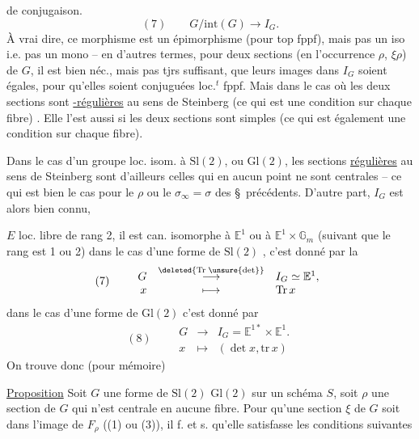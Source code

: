 de conjugaison.
\[
(7)\qquad G/\mathrm{int}(G)\longrightarrow I_G.
\]
À vrai dire,  ce morphisme est un épimorphisme (pour  top fppf), mais pas un iso i.e. pas un mono -- en d'autres termes, pour deux sections (en l'occurrence $\rho$, $\xi\rho$) de $G$, il est bien néc., mais pas tjrs suffisant, que leurs images dans $I_G$ soient égales, pour qu'elles soient conjuguées loc.$^{t}$ fppf. Mais dans le cas où les deux sections sont \uline{-régulières} au sens de Steinberg (ce qui est une condition sur chaque fibre)  . Elle l'est aussi si les deux sections sont  simples (ce qui est également une condition sur chaque fibre).

Dans le cas d'un groupe loc. isom. à $\mathrm{Sl}(2)$,  ou $\mathrm{Gl}(2)$, les sections \uline{régulières} au sens de Steinberg sont d'ailleurs celles qui en aucun point ne sont centrales -- ce qui est bien le cas pour le $\rho$ ou le $\sigma_\infty=\sigma$ des \S\ précédents. D'autre part, $I_G$ est alors bien connu, 

$E$ loc. libre de rang 2, il est can. isomorphe à $\mathbb E^1$ ou à $\mathbb E^1\times\mathbb G_m$ (suivant que le rang est 1 ou 2) dans le cas d'une forme de $\mathrm{Sl}(2)$ , c'est donné par la \uline{}
\[
(7)\qquad
\begin{array}{rcl}
G&\overset{\deleted{\mathrm{Tr}\;\unsure{\det}}}{\longrightarrow}&I_G\simeq\mathbb E^1,\\
x&\longmapsto&\mathrm{Tr}\,x
\end{array}
\]
dans le cas d'une forme de $\mathrm{Gl}(2)$ c'est donné par
\[
(8)\qquad
\begin{array}{rcl}
G&\longrightarrow&I_G=\mathbb E^{1*}\times\mathbb E^1.\\
x&\longmapsto&(\det x,\mathrm{tr}\,x)
\end{array}
\]
On trouve donc (pour mémoire)

\uline{Proposition} Soit $G$ une forme de $\mathrm{Sl}(2)$  $\mathrm{Gl}(2)$ sur un schéma $S$, soit $\rho$ une section de $G$ qui n'est centrale en aucune fibre. Pour qu'une section $\xi$ de $G$ soit  dans l'image de $F_\rho$ ((1) ou (3)), il f. et s. qu'elle satisfasse les conditions suivantes

